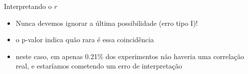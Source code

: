 \documentclass{beamer}
\begin{document}
\begin{frame}{Interpretando o $r$}
  \begin{itemize}
  \item Nunca devemos ignorar a última possibilidade (erro tipo I)!
  \item o p-valor indica quão rara é essa coincidência
  \item neste caso, em apenas 0.21\% dos experimentos não haveria uma
    correlação real, e estaríamos cometendo um erro de interpretação
  \end{itemize}
\end{frame}



\end{document}
